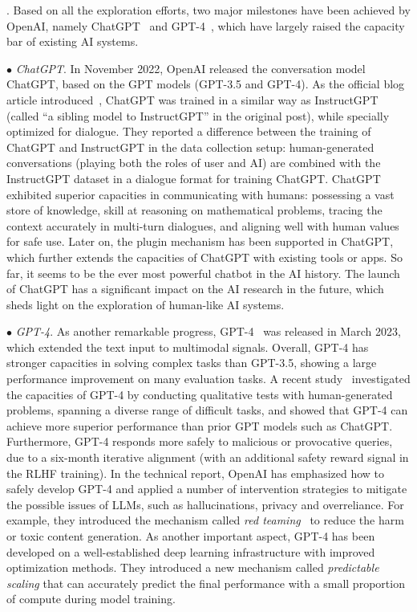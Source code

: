 %

. 
Based on all the exploration efforts, two major milestones have been achieved by OpenAI, namely  ChatGPT~\cite{OpenAI-blog-2022-ChatGPT} and GPT-4~\cite{OpenAI-OpenAI-2023-GPT-4}, which have largely raised the capacity bar of existing AI systems. 

$\bullet$ \emph{ChatGPT}. In November 2022, OpenAI released the conversation model  ChatGPT, based on the GPT models (GPT-3.5 and GPT-4). As the official blog article introduced~\cite{OpenAI-blog-2022-ChatGPT}, ChatGPT was trained in a similar way as InstructGPT (called ``a sibling model to InstructGPT'' in the original post), while specially optimized for dialogue. 
They reported a difference between the training of ChatGPT and InstructGPT in  the data collection setup: human-generated conversations (playing both the roles of user and AI) are combined with the InstructGPT dataset in a dialogue format for training ChatGPT.  
ChatGPT exhibited superior capacities in communicating with humans: possessing  a vast store of knowledge,  skill at reasoning on mathematical problems, tracing the context accurately in multi-turn dialogues, and aligning well with human values for safe use. Later on, the plugin mechanism has been supported in ChatGPT, which further  extends the capacities of ChatGPT with existing tools or apps.
So far, it seems to be the ever most powerful chatbot in the AI history. The launch of ChatGPT has a significant impact on the AI research in the future, which sheds light on the exploration of  human-like AI systems. 

$\bullet$ \emph{GPT-4}. As another remarkable progress,  GPT-4~\cite{OpenAI-OpenAI-2023-GPT-4} was released in March 2023, which extended the text input to multimodal signals. 
Overall, GPT-4 has  stronger capacities  in solving complex tasks than GPT-3.5, showing a large performance improvement on many evaluation tasks. 
A recent study~\cite{Bubeck-arxiv-2023-Sparks}  investigated the capacities of GPT-4 by conducting qualitative tests with human-generated  problems, spanning a diverse range of difficult  tasks, and showed  that GPT-4 can achieve more superior performance than prior GPT models such as ChatGPT. 
Furthermore, GPT-4  responds more safely to  malicious or provocative queries, due to a six-month iterative alignment (with an additional  safety reward signal in the RLHF training). 
In the technical report, OpenAI has emphasized how to safely develop GPT-4 and applied  a number of  intervention strategies  to mitigate the possible issues of LLMs, such as hallucinations, privacy and overreliance. For example, they introduced the mechanism called \emph{red teaming}~\cite{Ganguli-arxiv-2022-Red}  to reduce the harm or toxic content generation. 
As another important aspect, GPT-4 has been developed on a well-established deep learning infrastructure with improved optimization methods. They  introduced a new mechanism called \emph{predictable scaling} that can  accurately predict the final performance with a small proportion of compute during model training. 

